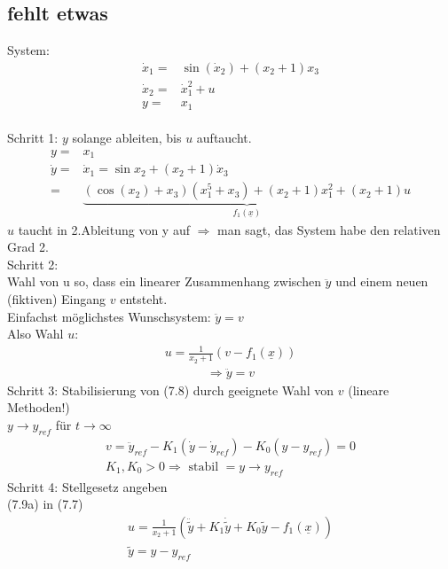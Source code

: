 \documentclass[ngerman]{tudscrreprt}
\begin{document}
\subsection{fehlt etwas}
System: \\
\begin{align*}
\dot x_1 =&\sin{(\dot x_2)} + (x_2 + 1)x_3\\
\dot x_2 =&\dot x_1^2 + u \tag{7.5}\\
y =& x_1
\end{align*}\\
Schritt 1: $y$ solange ableiten, bis $u$ auftaucht.
\begin{align*}
y=&x_1\\
\dot y =& \dot x_1  = \sin{x_2} + (x_2 + 1)\dot x_3\\
=&\underbrace{(\cos(x_2) + x_3)(x_1^5 + x_3) + (x_2 + 1)x_1^2 + (x_2 + 1)u}_{f_1(\underline x)}\tag{7.6}
\end{align*}
$u $ taucht in 2.Ableitung von y auf $\Rightarrow$ man sagt, das System habe den relativen Grad 2.\\
Schritt 2:\\
Wahl von u so, dass ein linearer Zusammenhang zwischen $\ddot y$ und einem neuen (fiktiven) Eingang $v$ entsteht.\\
Einfachst möglichstes Wunschsystem: $\ddot y = v$\\
Also Wahl $u$: \begin{align*}u = \frac{1}{x_2 + 1} (v - f_1(\underline x)) \tag{7.7}\end{align*}
\begin{align*}\Rightarrow \ddot y = v \tag{7.8}\end{align*}
Schritt 3: Stabilisierung von (7.8) durch geeignete Wahl von $v$ (lineare Methoden!)\\
$y \to y_{ref}$ für $t\to \infty$\\
\begin{align*}v= \ddot y_{ref} - K_1(\dot y - \dot y_{ref} ) - K_0(y-y_{ref}) = 0 \tag{7.9b}\\
K_1, K_0 > 0 \Rightarrow \text{ stabil } = y\to y_{ref}
\end{align*}
Schritt 4: Stellgesetz angeben\\
(7.9a) in (7.7)\\
\begin{align*}
u = \frac{1}{x_2 + 1}(\ddot{\tilde y} + K_1 \dot{\tilde y} + K_0 \tilde y - f_1(\underline x)  )\tag{7.10}\\
\tilde y = y- y_{ref}
\end{align*}
\end{document}
